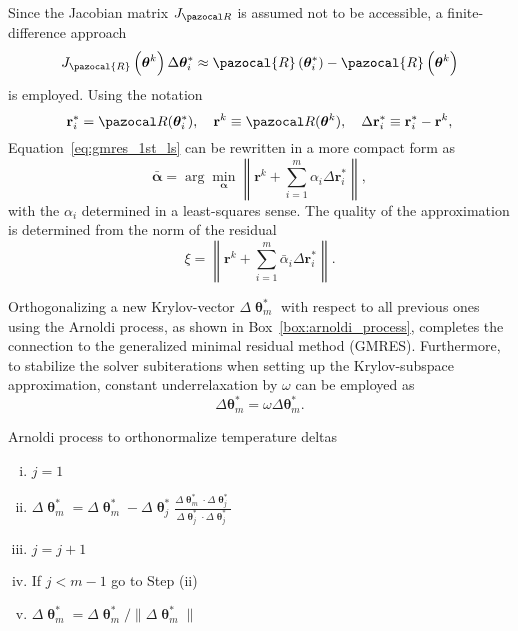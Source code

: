 Since the Jacobian matrix $J_{\pazocal R}$ is assumed not to be accessible, a finite-difference approach
\begin{equation}
J_{\pazocal{R}}\left(\boldsymbol{\theta}^{k}\right) \Delta \boldsymbol{\theta}^*_{i} \approx \pazocal{R}\left(\boldsymbol{\theta}^*_{i}\right)-\pazocal{R}\left(\boldsymbol{\theta}^{k}\right)
\end{equation}
is employed.
Using the notation
\begin{equation}
\mathbf r^*_i = \pazocal R(\boldsymbol \theta^*_i),\quad
\mathbf r^k \equiv  \pazocal R(\boldsymbol \theta^k),\quad
\Delta \mathbf r_i^* \equiv \mathbf r_i^* - \mathbf r^k,
\end{equation}
Equation~\eqref{eq:gmres_1st_ls} can be rewritten in a more compact form as
\begin{equation} \label{eq:gmres_ls_condition}
\bar{\boldsymbol \alpha} = \arg\min_{\boldsymbol \alpha} \left\|\mathbf r^k+\sum_{i=1}^m\alpha_i\Delta\mathbf r^*_i\right\|,
\end{equation}
with the $\alpha_i$ determined in a least-squares sense.
The quality of the approximation is determined from the norm of the residual
\begin{equation} \label{eq:gmres_residual}
\xi=\left\|\boldsymbol{r}^{k}+\sum_{i=1}^{m} \bar{\alpha}_{i} \Delta \boldsymbol{r}^*_{i}\right\|.
\end{equation}

Orthogonalizing a new Krylov-vector $\Delta \bm{\uptheta}^*_{m}$ with respect to all previous ones using the Arnoldi process, as shown in Box~\ref{box:arnoldi_process}, completes the connection to the generalized minimal residual method (GMRES).
Furthermore, to stabilize the solver subiterations when setting up the Krylov-subspace approximation, constant underrelaxation by $\omega$ can be employed as
\begin{equation}
\Delta \boldsymbol{\theta}^*_{m}=\omega \Delta \boldsymbol{\theta}^*_{m}.
\end{equation}

\begin{framedbox}[htbp]
  \caption{Arnoldi process to orthonormalize temperature deltas}
  \label{box:arnoldi_process}
  \begin{center}
    \begin{minipage}{0.9\textwidth}
    \begin{enumerate}[(i)]
      \item \(j=1\)
      \item \(\Delta \bm\uptheta^*_m = \Delta \bm\uptheta^*_m - \Delta \bm\uptheta^*_j\frac{\Delta\bm\uptheta^*_m\cdot\Delta\bm\uptheta^*_j}{\Delta\bm \uptheta^*_j\cdot\Delta\bm\uptheta^*_j}\)
      \item \(j=j+1\)
      \item If \(j<m-1\) go to Step (ii)
      \item \(\Delta\bm \uptheta^*_m = \Delta\bm\uptheta^*_m/\|\Delta \bm \uptheta^*_m\|\)
    \end{enumerate}
    \end{minipage}
  \end{center}
\end{framedbox}


